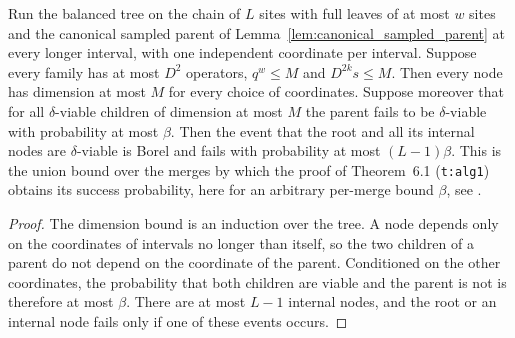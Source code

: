 \begin{lemma}
    \label{lem:canonical_word_trim_tree_failure}
    \leanok
    Run the balanced tree on the chain of $L$ sites with full leaves of at
    most $w$ sites and the canonical sampled parent of
    Lemma~\ref{lem:canonical_sampled_parent} at every longer interval, with
    one independent coordinate per interval. Suppose every family has at most
    $D^2$ operators, $q^w\le M$ and $D^{2k}s\le M$. Then every node has
    dimension at most $M$ for every choice of coordinates. Suppose moreover
    that for all $\delta$-viable children of dimension at most $M$ the parent
    fails to be $\delta$-viable with probability at most $\beta$. Then the
    event that the root and all its internal nodes are $\delta$-viable is
    Borel and fails with probability at most $(L-1)\beta$. This is the union
    bound over the merges by which the proof of Theorem~6.1
    (\texttt{t:alg1}) obtains its success probability, here for an arbitrary
    per-merge bound $\beta$, see \cite{gap:alvv16_approximation_parameters}.
\end{lemma}
\begin{proof}\leanok
    The dimension bound is an induction over the tree. A node depends only on
    the coordinates of intervals no longer than itself, so the two children
    of a parent do not depend on the coordinate of the parent. Conditioned on
    the other coordinates, the probability that both children are viable and
    the parent is not is therefore at most $\beta$. There are at most $L-1$
    internal nodes, and the root or an internal node fails only if one of
    these events occurs.
\end{proof}

